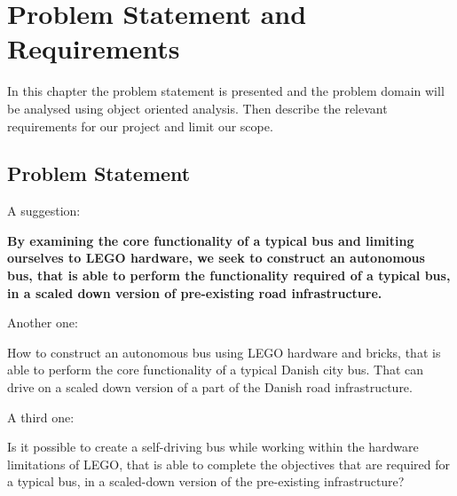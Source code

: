 \chapter{Problem Statement and Requirements}



In this chapter the problem statement is presented and the problem domain will be analysed using object oriented analysis. Then describe the relevant requirements for our project and limit our scope.

\section{Problem Statement}
A suggestion:

\textbf{By examining the core functionality of a typical bus and limiting ourselves to LEGO hardware, we seek to construct an autonomous bus, that is able to perform the functionality required of a typical bus, in a scaled down version of pre-existing road infrastructure.}

Another one:

How to construct an autonomous bus using LEGO hardware and bricks, that is able to perform the core functionality of a typical Danish city bus. That can drive on a scaled down version of a part of the Danish road infrastructure.

A third one:

Is it possible to create a self-driving bus while working within the hardware limitations of LEGO, that is able to complete the objectives that are required for a typical bus, in a scaled-down version of the pre-existing infrastructure?






